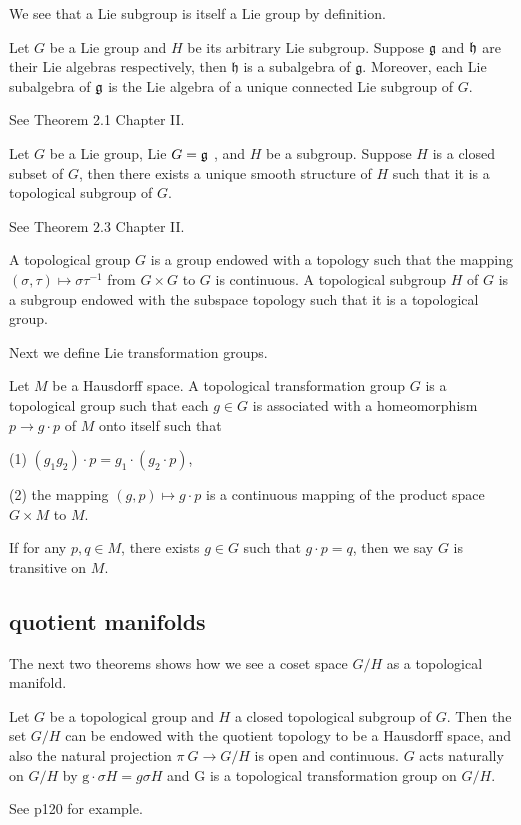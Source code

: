  We see that a Lie subgroup is itself a Lie group by definition.

\begin{theorem}
	Let $G$ be a  Lie group and $H$ be its arbitrary Lie
	subgroup. Suppose ${\mathfrak g}$ and ${\mathfrak h}$ are their Lie algebras
	respectively,
	then
	 $\mathfrak{h}$ is a subalgebra of $\mathfrak{g} .$ Moreover,
	 each Lie subalgebra of ${\mathfrak g}$ is the Lie algebra of a unique
	 connected Lie subgroup of $G$.
\end{theorem}
\bproof See \cite{Hel} Theorem 2.1 Chapter II.
\eproof
\begin{theorem}
	Let $G$ be a Lie group,  Lie $G={\mathfrak g}$ , and $H$ be a
	subgroup. Suppose $H$ is a closed subset of $G$, then there
	exists a unique smooth
	structure of ${H}$ such that it is a topological subgroup of
	$G$.
\end{theorem}
\bproof
See \cite{Hel} Theorem $2.3$ Chapter II.
\eproof

\begin{definition}
	A topological group $G$ is a group endowed with a topology
	such that the mapping $(\sigma, \tau) \mapsto \sigma
	\tau^{-1}$ from $G \times G$ to $G$ is continuous. A
	topological subgroup $H$ of $G$ is a subgroup endowed with
	the subspace topology such that it is a topological group.
\end{definition}

Next we define Lie transformation groups.
\begin{definition}
Let $M$ be a Hausdorff space. A topological transformation group
$G$ is a topological group such that each $g \in G$ is associated
with a homeomorphism $p \rightarrow g \cdot p$ of $M$ onto itself
such that

(1) $\left(g_{1} g_{2}\right) \cdot p=g_{1} \cdot \left( g_{2}
\cdot p \right)$,

(2) the mapping $(g, p) \mapsto g \cdot p$ is a continuous
mapping of the product space $G \times M$ to $M$.

If for any $p, q \in M$, there exists $g \in G$ such that $g
\cdot p=q$, then we say $G$ is transitive on $M$.	
\end{definition}
\subsection{quotient manifolds}

The next two theorems shows how we see a coset space $G / H$ as a
topological manifold.

\begin{theorem}
	Let $G$ be a topological group and $H$ a closed topological
	subgroup of $G$. Then the set $G / H$ can be endowed
	with the quotient topology to be a Hausdorff space, and also
	the natural projection $\pi\: G \rightarrow G / H$ is open
	and continuous. $G$ acts naturally on $G / H$ by $\mathrm{g}
	\cdot {\sigma H}={g} \sigma {H}$ and $\mathrm{G}$ is a
	topological transformation group on ${G} /{H}$.
\end{theorem}
\bproof
See \cite{Hel} p120 for example. 
\eproof

